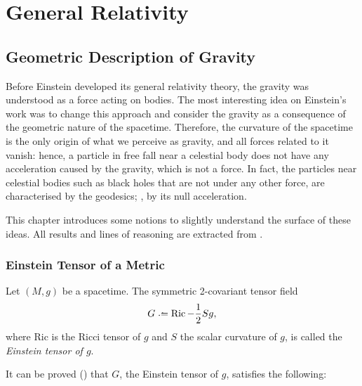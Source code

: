 \chapter{General Relativity}
\label{chapter:general-relativity}


\section{Geometric Description of Gravity}
\label{chapter:einstein}

Before Einstein developed its general relativity theory, the gravity was understood as a force acting on bodies. The most interesting idea on Einstein's work was to change this approach and consider the gravity as a consequence of the geometric nature of the spacetime. Therefore, the curvature of the spacetime is the only origin of what we perceive as gravity, and all forces related to it vanish: hence, a particle in free fall near a celestial body does not have any acceleration caused by the gravity, which is not a force. In fact, the particles near celestial bodies such as black holes that are not under any other force, are characterised by the geodesics; \ie, by its null acceleration.

This chapter introduces some notions to slightly understand the surface of these ideas. All results and lines of reasoning are extracted from \cite[Ch. 4]{sachs77}.

\subsection{Einstein Tensor of a Metric}

\begin{definition}
	Let $(M,g)$ be a spacetime. The symmetric 2-covariant tensor field
	\[
	G \defeq \operatorname{Ric}-\frac{1}{2}Sg,
	\]
	where Ric is the Ricci tensor of $g$ and $S$ the scalar curvature of $g$, is called the \emph{Einstein tensor of $g$}.
\end{definition}

It can be proved (\cite{sachs77}) that $G$, the Einstein tensor of $g$, satisfies the following:

